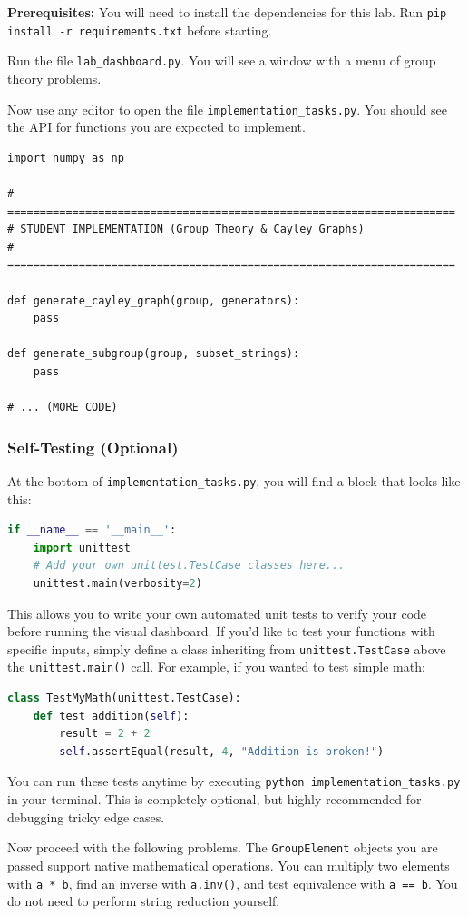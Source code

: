 \documentclass[11pt]{article}
\begin{document}
\textbf{Prerequisites:} You will need to install the dependencies for this lab. Run \lstinline|pip install -r requirements.txt| before starting.

Run the file \lstinline|lab_dashboard.py|. You will see a window with a menu of group theory problems.

Now use any editor to open the file \lstinline|implementation_tasks.py|. You should see the API for functions you are expected to implement.
\begin{lstlisting}
import numpy as np

# =====================================================================
# STUDENT IMPLEMENTATION (Group Theory & Cayley Graphs)
# =====================================================================

def generate_cayley_graph(group, generators):
    pass

def generate_subgroup(group, subset_strings):
    pass

# ... (MORE CODE)
\end{lstlisting}

\subsubsection*{Self-Testing (Optional)}
At the bottom of \lstinline|implementation_tasks.py|, you will find a block that looks like this:
\begin{lstlisting}[language=Python]
if __name__ == '__main__':
    import unittest
    # Add your own unittest.TestCase classes here...
    unittest.main(verbosity=2)
\end{lstlisting}
This allows you to write your own automated unit tests to verify your code before running the visual dashboard. If you'd like to test your functions with specific inputs, simply define a class inheriting from \lstinline|unittest.TestCase| above the \lstinline|unittest.main()| call. For example, if you wanted to test simple math:
\begin{lstlisting}[language=Python]
class TestMyMath(unittest.TestCase):
    def test_addition(self):
        result = 2 + 2
        self.assertEqual(result, 4, "Addition is broken!")
\end{lstlisting}
You can run these tests anytime by executing \lstinline|python implementation_tasks.py| in your terminal. This is completely optional, but highly recommended for debugging tricky edge cases.

Now proceed with the following problems. The \lstinline|GroupElement| objects you are passed support native mathematical operations. You can multiply two elements with \lstinline|a * b|, find an inverse with \lstinline|a.inv()|, and test equivalence with \lstinline|a == b|. You do not need to perform string reduction yourself.
\end{document}
